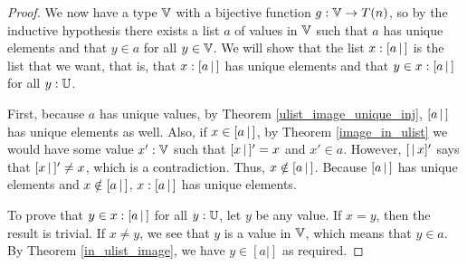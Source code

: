 \documentclass[../math.tex]{subfiles}
\begin{document}
\begin{proof}
    We now have a type $\mathbb{V}$ with a bijective function $g : \mathbb{V} \to T(n)$, so by
    the inductive hypothesis there exists a list $a$ of values in $\mathbb{V}$ such that
    $a$ has unique elements and that $y \in a$ for all $y \in \mathbb{V}$.  We will show
    that the list $x : [ a\, |\,]$ is the list that we want, that is, that $x
    :[ a\, |\,]$ has unique elements and that $y \in x :[ a\, |\,]$ for all $y : \mathbb{U}$.

    First, because $a$ has unique values, by Theorem
    \ref{ulist_image_unique_inj}, $[ a\, |\,]$ has unique elements as well.  Also,
    if $x \in [ a\, |\,]$, by Theorem \ref{image_in_ulist} we would have some value
    $x' : \mathbb{V}$ such that $[ x\, |\,]' = x$ and $x' \in a$.  However, $[ \,|\, x ]'$ says
    that $[ x\, |\,]' \neq x$, which is a contradiction.  Thus, $x \notin [ a\, |\,]$.
    Because $[ a\, |\,]$ has unique elements and $x \notin [ a\, |\,]$, $x : [ a\, |\,]$ has
    unique elements.

    To prove that $y \in x : [ a\, |\,]$ for all $y : \mathbb{U}$, let $y$ be any value.  If
    $x = y$, then the result is trivial.  If $x \neq y$, we see that $y$ is a
    value in $\mathbb{V}$, which means that $y \in a$.  By Theorem \ref{in_ulist_image},
    we have $y \in [a|]$ as required.
\end{proof}
\end{document}
